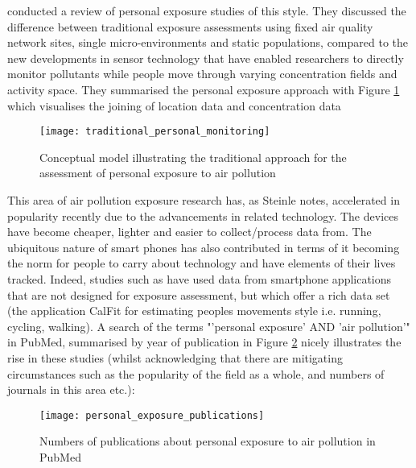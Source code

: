 \cite{Steinle2013} conducted a review of personal exposure studies of this style. They discussed the difference between traditional exposure assessments using fixed air quality network sites, single micro-environments and static populations, compared to the new developments in sensor technology that have enabled researchers to directly monitor pollutants while people move through varying concentration fields and activity space. They summarised the personal exposure approach with Figure \ref{fig:traditional_personal_monitoring} which visualises the joining of location data and concentration data

\begin{figure}[H]
\centering
\texttt{[image: traditional\_personal\_monitoring]}
\caption{Conceptual model illustrating the traditional approach for the assessment of personal exposure to air pollution \cite{Steinle2013}}
\label{fig:traditional_personal_monitoring}
\end{figure}

This area of air pollution exposure research has, as Steinle notes, accelerated in popularity recently due to the advancements in related technology. The devices have become cheaper, lighter and easier to collect/process data from. The ubiquitous nature of smart phones has also contributed in terms of it becoming the norm for people to carry about technology and have elements of their lives tracked. Indeed, studies such as \cite{DeNazelle2013} have used data from smartphone applications that are not designed for exposure assessment, but which offer a rich data set (the application CalFit for estimating peoples movements style i.e. running, cycling, walking). A search of the terms "'personal exposure' AND 'air pollution'" in PubMed, summarised by year of publication in Figure \ref{fig:personal_exposure_publications} nicely illustrates the rise in these studies (whilst acknowledging that there are mitigating circumstances such as the popularity of the field as a whole, and numbers of journals in this area etc.):

\begin{figure}[H]
\centering
\texttt{[image: personal\_exposure\_publications]}
\caption{Numbers of publications about personal exposure to air pollution in PubMed}
\label{fig:personal_exposure_publications}
\end{figure}

